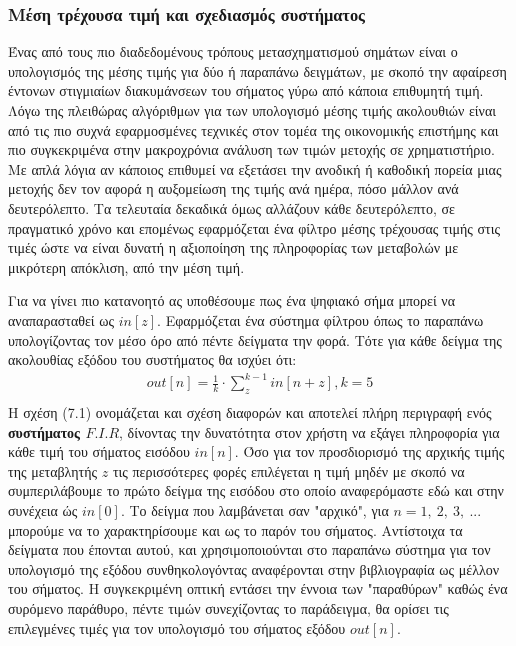 \documentclass[breaklines=true, 12pt]{article}
\begin{document}
\subsubsection{Μέση τρέχουσα τιμή και σχεδιασμός συστήματος}
\label{sec:orgc77789d}
Ένας από τους πιο διαδεδομένους τρόπους μετασχηματισμού σημάτων είναι ο υπολογισμός
της μέσης τιμής για δύο ή παραπάνω δειγμάτων, με σκοπό την αφαίρεση έντονων στιγμιαίων
διακυμάνσεων του σήματος γύρω από κάποια επιθυμητή τιμή. Λόγω της πλειθώρας αλγόριθμων
για των υπολογισμό μέσης τιμής ακολουθιών είναι από τις πιο συχνά εφαρμοσμένες τεχνικές
στον τομέα της οικονομικής επιστήμης και πιο συγκεκριμένα στην μακροχρόνια ανάλυση των
τιμών μετοχής σε χρηματιστήριο. Με απλά λόγια αν κάποιος επιθυμεί να εξετάσει την
ανοδική ή καθοδική πορεία μιας μετοχής δεν τον αφορά η αυξομείωση της τιμής ανά ημέρα,
πόσο μάλλον ανά δευτερόλεπτο. Τα τελευταία δεκαδικά όμως αλλάζουν κάθε δευτερόλεπτο, σε
πραγματικό χρόνο και επομένως εφαρμόζεται ένα φίλτρο μέσης τρέχουσας τιμής στις τιμές
ώστε να είναι δυνατή η αξιοποίηση της πληροφορίας των μεταβολών με μικρότερη απόκλιση,
από την μέση τιμή.

Για να γίνει πιο κατανοητό ας υποθέσουμε πως ένα ψηφιακό σήμα μπορεί να αναπαρασταθεί
ως \(in[z]\). Εφαρμόζεται ένα σύστημα φίλτρου όπως το παραπάνω υπολογίζοντας τον μέσο όρο από
πέντε δείγματα την φορά. Τότε για κάθε δείγμα της ακολουθίας εξόδου του συστήματος θα
ισχύει ότι:
\begin{equation}
\begin{align}
out[n] = \frac{1}{k} \cdot \sum_{z}^{{k-1}}in[n+z], k=5 \\
\end{align}
\end{equation}
Η σχέση (7.1) ονομάζεται και σχέση διαφορών και αποτελεί πλήρη περιγραφή ενός \textbf{συστήματος
\(F.I.R\)}, δίνοντας την δυνατότητα στον χρήστη να εξάγει πληροφορία για κάθε τιμή του σήματος
εισόδου \(in[n]\). Όσο για τον προσδιορισμό της αρχικής τιμής της μεταβλητής \(z\) τις περισσότερες
φορές επιλέγεται η τιμή μηδέν με σκοπό να συμπεριλάβουμε το πρώτο δείγμα της εισόδου
στο οποίο αναφερόμαστε εδώ και στην συνέχεια ώς \(in[0]\). Το δείγμα που λαμβάνεται σαν "αρχικό",
για \(n = 1,\ 2,\ 3,\ ...\) μπορούμε να το χαρακτηρίσουμε και ως το παρόν του σήματος. Αντίστοιχα τα
δείγματα που έπονται αυτού, και χρησιμοποιούνται στο παραπάνω σύστημα για τον υπολογισμό
της εξόδου συνθηκολογόντας αναφέρονται στην βιβλιογραφία ως μέλλον του σήματος. Η
συγκεκριμένη οπτική εντάσει την έννοια των "παραθύρων" καθώς ένα συρόμενο παράθυρο, πέντε
τιμών συνεχίζοντας το παράδειγμα, θα ορίσει τις επιλεγμένες τιμές για τον υπολογισμό του
σήματος εξόδου \(out[n]\).
\end{document}
